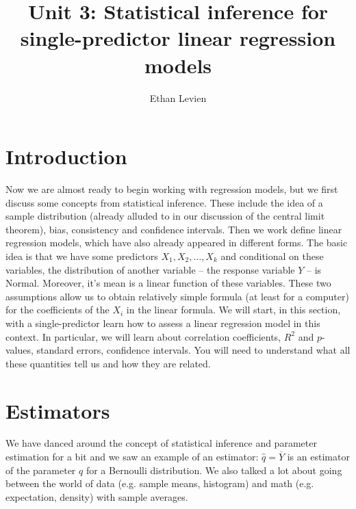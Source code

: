 
\usepackage{environ}

\setcounter{unit}{3}
\setcounter{section}{0}



\title{Unit 3: Statistical inference for single-predictor linear regression models}
\author{Ethan Levien}
\maketitle
\tableofcontents



\newif\ifhideproofs

\ifhideproofs
\NewEnviron{hide}{}
\let\proof\hide
\let\endproof\endhide
\fi






\section{Introduction}


Now we are almost ready to begin working with regression models, but we first discuss some concepts from statistical inference. These include the idea of a sample distribution (already alluded to in our discussion of the central limit theorem), bias, consistency and confidence intervals. Then we work define linear regression models, which have also already appeared in different forms.    The basic idea is that we have some predictors $X_1,X_2,\dots,X_k$ and conditional on these variables, the distribution of another variable -- the response variable $Y$ -- is Normal. Moreover, it's mean is a linear function of these variables. These two assumptions allow us to obtain relatively simple formula (at least for a computer) for the coefficients of the $X_i$ in the linear formula. We will start, in this section, with a single-predictor learn how to assess a linear regression model in this context. In particular, we will learn about correlation coefficients, $R^2$ and $p$-values, standard errors, confidence intervals. You will need to understand what all these quantities tell us and how they are related. 





\section{Estimators}
We have danced around the concept of statistical inference and parameter estimation for a bit and we saw an example of an estimator: $\hat{q} = \overline{Y}$ is an estimator of the parameter $q$ for a Bernoulli distribution.  We also talked a lot about going between the world of data (e.g. sample means, histogram) and math (e.g. expectation, density) with sample averages. 

